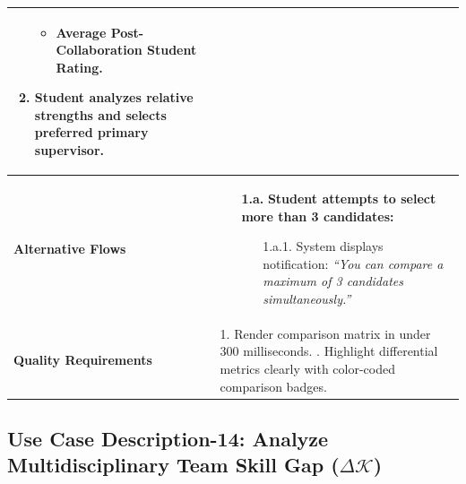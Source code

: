 \begin{table}[H]
\begin{tabularx}{\textwidth}{|l|X|}
\begin{enumerate}[leftmargin=*]
\begin{itemize}[leftmargin=*]
        \item Average Post-Collaboration Student Rating.
    \end{itemize}
    \item Student analyzes relative strengths and selects preferred primary supervisor.
\end{enumerate} \\ \hline
\textbf{Alternative Flows} &
\begin{itemize}[leftmargin=*]
    \item[\textbf{1.a.}] \textbf{Student attempts to select more than 3 candidates:}
    \begin{itemize}[leftmargin=*]
        \item[1.a.1.] System displays notification: \textit{``You can compare a maximum of 3 candidates simultaneously.''}
    \end{itemize}
\end{itemize} \\ \hline
\textbf{Quality Requirements} & 
1. Render comparison matrix in under 300 milliseconds. \newline
2. Highlight differential metrics clearly with color-coded comparison badges. \\ \hline
\end{tabularx}
\end{table}

\clearpage
\subsection{Use Case Description-14: Analyze Multidisciplinary Team Skill Gap ($\Delta \mathcal{K}$)}
\label{subsec:uc14}

